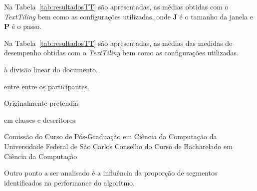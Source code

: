   Na Tabela~\ref{tab:resultadosTT} são apresentadas, as médias obtidas com o \textit{TextTiling} bem como as configurações utilizadas, onde \textbf{J} é o tamanho da janela e \textbf{P} é o passo.



Na Tabela~\ref{tab:resultadosTT} são apresentadas, as médias das medidas de desempenho obtidas com o \textit{TextTiling} bem como as configurações utilizadas.


















































à divisão linear do documento.  

entre entre os participantes. 







Originalmente pretendia 



em classes e descritores 



Comissão do Curso de Pós-Graduação em Ciência da Computação da Universidade Federal de São Carlos 
Conselho do Curso de Bacharelado em Ciência da Computação










Outro ponto a ser analisado é a influência da proporção de segmentos identificados na performance do algoritmo. 

